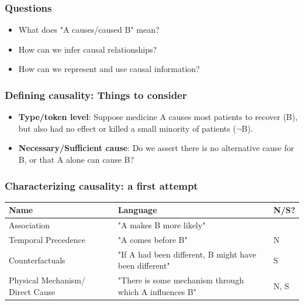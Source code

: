 \documentclass[handout]{beamer}
\begin{document}
\begin{frame}
\frametitle{Questions} \pause
\begin{itemize}
\item What does "A causes/caused B" mean? \pause
\item How can we infer causal relationships? \pause
\item How can we represent and use causal information? \pause
\end{itemize}
\end{frame}


\begin{frame}
\frametitle{Defining causality: Things to consider}
\begin{itemize}
	\item \textbf{Type/token level}: Suppose medicine A causes most patients to recover (B), but also had no effect or killed a small minority of patients ($\neg$B). \pause
	\item \textbf{Necessary/Sufficient cause}: Do we assert there is no alternative cause for B, or that A alone can cause B? 
\end{itemize}
\end{frame}

\begin{frame}
\frametitle{Characterizing causality: a first attempt}
\begin{table}[]
\begin{tabular}{|p{3.7 cm}|p{5cm}|p{2cm}|}
\hline
\textbf{Name}                   & \textbf{Language}                                      & \textbf{N/S?} \\ \hline
Association                     & "A makes B more likely"                                &               \\ \hline
Temporal Precedence             & "A comes before B"                                     & N             \\ \hline
Counterfactuals                 & "If A had been different, B might have been different" & S             \\ \hline
Physical Mechanism/ Direct Cause & "There is some mechanism through which A influences B" & N, S          \\ \hline
\end{tabular}
\end{table}

\end{frame}
\end{document}
